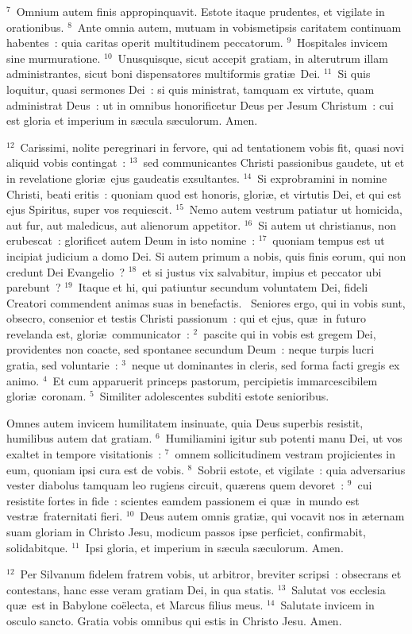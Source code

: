 ${}^{7}$~Omnium autem finis appropinquavit. Estote itaque prudentes, et vigilate in orationibus.
${}^{8}$~Ante omnia autem, mutuam in vobismetipsis caritatem continuam habentes~: quia caritas operit multitudinem peccatorum.
${}^{9}$~Hospitales invicem sine murmuratione.
${}^{10}$~Unusquisque, sicut accepit gratiam, in alterutrum illam administrantes, sicut boni dispensatores multiformis grati\ae\ Dei.
${}^{11}$~Si quis loquitur, quasi sermones Dei~: si quis ministrat, tamquam ex virtute, quam administrat Deus~: ut in omnibus honorificetur Deus per Jesum Christum~: cui est gloria et imperium in s\ae cula s\ae culorum. Amen.


${}^{12}$~Carissimi, nolite peregrinari in fervore, qui ad tentationem vobis fit, quasi novi aliquid vobis contingat~:
${}^{13}$~sed communicantes Christi passionibus gaudete, ut et in revelatione glori\ae\ ejus gaudeatis exsultantes.
${}^{14}$~Si exprobramini in nomine Christi, beati eritis~: quoniam quod est honoris, glori\ae , et virtutis Dei, et qui est ejus Spiritus, super vos requiescit.
${}^{15}$~Nemo autem vestrum patiatur ut homicida, aut fur, aut maledicus, aut alienorum appetitor.
${}^{16}$~Si autem ut christianus, non erubescat~: glorificet autem Deum in isto nomine~:
${}^{17}$~quoniam tempus est ut incipiat judicium a domo Dei. Si autem primum a nobis, quis finis eorum, qui non credunt Dei Evangelio~?
${}^{18}$~et si justus vix salvabitur, impius et peccator ubi parebunt~?
${}^{19}$~Itaque et hi, qui patiuntur secundum voluntatem Dei, fideli Creatori commendent animas suas in benefactis.
~\lettrine[lines=10,image=true,loversize=0.05,lraise=-0.03]{S}{}eniores ergo, qui in vobis sunt, obsecro, consenior et testis Christi passionum~: qui et ejus, qu\ae\ in futuro revelanda est, glori\ae\ communicator~:
${}^{2}$~pascite qui in vobis est gregem Dei, providentes non coacte, sed spontanee secundum Deum~: neque turpis lucri gratia, sed voluntarie~:
${}^{3}$~neque ut dominantes in cleris, sed forma facti gregis ex animo.
${}^{4}$~Et cum apparuerit princeps pastorum, percipietis immarcescibilem glori\ae\ coronam.
${}^{5}$~Similiter adolescentes subditi estote senioribus.

 Omnes autem invicem humilitatem insinuate, quia Deus superbis resistit, humilibus autem dat gratiam.
${}^{6}$~Humiliamini igitur sub potenti manu Dei, ut vos exaltet in tempore visitationis~:
${}^{7}$~omnem sollicitudinem vestram projicientes in eum, quoniam ipsi cura est de vobis.
${}^{8}$~Sobrii estote, et vigilate~: quia adversarius vester diabolus tamquam leo rugiens circuit, qu\ae rens quem devoret~:
${}^{9}$~cui resistite fortes in fide~: scientes eamdem passionem ei qu\ae\ in mundo est vestr\ae\ fraternitati fieri.
${}^{10}$~Deus autem omnis grati\ae , qui vocavit nos in \ae ternam suam gloriam in Christo Jesu, modicum passos ipse perficiet, confirmabit, solidabitque.
${}^{11}$~Ipsi gloria, et imperium in s\ae cula s\ae culorum. Amen.


${}^{12}$~Per Silvanum fidelem fratrem vobis, ut arbitror, breviter scripsi~: obsecrans et contestans, hanc esse veram gratiam Dei, in qua statis.
${}^{13}$~Salutat vos ecclesia qu\ae\ est in Babylone co\"electa, et Marcus filius meus.
${}^{14}$~Salutate invicem in osculo sancto. Gratia vobis omnibus qui estis in Christo Jesu. Amen.
